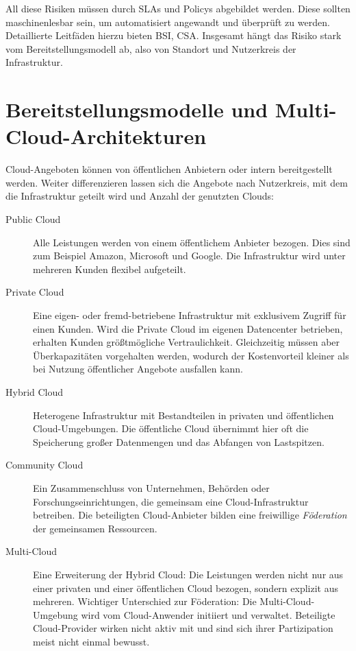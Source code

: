 All diese Risiken müssen durch SLAs und Policys abgebildet werden. Diese sollten maschinenlesbar sein, um automatisiert angewandt und überprüft zu werden. Detaillierte Leitfäden hierzu bieten BSI, CSA. Insgesamt hängt das Risiko stark vom Bereitstellungsmodell ab, also von Standort und Nutzerkreis der Infrastruktur.

\section{Bereitstellungsmodelle und Multi-Cloud-Architekturen}

Cloud-Angeboten können von öffentlichen Anbietern oder intern bereitgestellt werden. Weiter differenzieren lassen sich die Angebote nach Nutzerkreis, mit dem die Infrastruktur geteilt wird und Anzahl der genutzten Clouds:

\begin{description}
	
	\item[Public Cloud] Alle Leistungen werden von einem öffentlichem Anbieter bezogen. Dies sind zum Beispiel Amazon, Microsoft und Google. Die Infrastruktur wird unter mehreren Kunden flexibel aufgeteilt.
	
	\item[Private Cloud] Eine eigen- oder fremd-betriebene Infrastruktur mit exklusivem Zugriff für einen Kunden. Wird die Private Cloud im eigenen Datencenter betrieben, erhalten Kunden größtmögliche Vertraulichkeit. Gleichzeitig müssen aber Überkapazitäten vorgehalten werden, wodurch der Kostenvorteil kleiner als bei Nutzung öffentlicher Angebote ausfallen kann.
	
	\item[Hybrid Cloud] Heterogene Infrastruktur mit Bestandteilen in privaten und öffentlichen Cloud-Umgebungen. Die öffentliche Cloud übernimmt hier oft die Speicherung großer Datenmengen und das Abfangen von Lastspitzen.
	
	\item[Community Cloud] Ein Zusammenschluss von Unternehmen, Behörden oder Forschungseinrichtungen, die gemeinsam eine Cloud-Infrastruktur betreiben. Die beteiligten Cloud-Anbieter bilden eine freiwillige \emph{Föderation} der gemeinsamen Ressourcen.
	
	\item[Multi-Cloud] Eine Erweiterung der Hybrid Cloud: Die Leistungen werden nicht nur aus einer privaten und einer öffentlichen Cloud bezogen, sondern explizit aus mehreren. Wichtiger Unterschied zur Föderation: Die Multi-Cloud-Umgebung wird vom Cloud-Anwender initiiert und verwaltet. Beteiligte Cloud-Provider wirken nicht aktiv mit und sind sich ihrer Partizipation meist nicht einmal bewusst.
	
\end{description}

